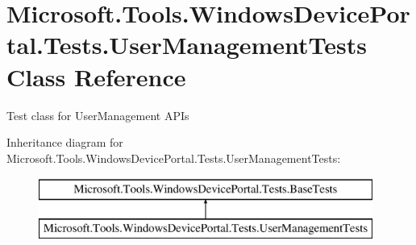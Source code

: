 \hypertarget{class_microsoft_1_1_tools_1_1_windows_device_portal_1_1_tests_1_1_user_management_tests}{}\section{Microsoft.\+Tools.\+Windows\+Device\+Portal.\+Tests.\+User\+Management\+Tests Class Reference}
\label{class_microsoft_1_1_tools_1_1_windows_device_portal_1_1_tests_1_1_user_management_tests}


Test class for User\+Management A\+P\+Is  


Inheritance diagram for Microsoft.\+Tools.\+Windows\+Device\+Portal.\+Tests.\+User\+Management\+Tests\+:\begin{figure}[H]
\begin{center}
\leavevmode
\includegraphics[height=2.000000cm]{class_microsoft_1_1_tools_1_1_windows_device_portal_1_1_tests_1_1_user_management_tests}
\end{center}
\end{figure}
